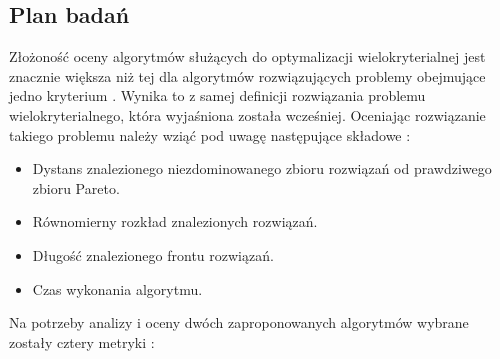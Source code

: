 \documentclass[twoside]{iisthesis}
\begin{document}
\subsection{Plan badań}
Złożoność oceny algorytmów służących do optymalizacji wielokryterialnej jest znacznie większa niż tej dla algorytmów rozwiązujących problemy obejmujące jedno kryterium \cite{comparison_deb}. Wynika to z samej definicji rozwiązania problemu wielokryterialnego, która wyjaśniona została wcześniej. Oceniając rozwiązanie takiego problemu należy wziąć pod uwagę następujące składowe \cite{comparison_2}:\\
\begin{itemize}
	\item Dystans znalezionego niezdominowanego zbioru rozwiązań od prawdziwego zbioru Pareto.
	\item Równomierny rozkład znalezionych rozwiązań.
	\item Długość znalezionego frontu rozwiązań.
	\item Czas wykonania algorytmu.\\
\end{itemize}
Na potrzeby analizy i oceny dwóch zaproponowanych algorytmów wybrane zostały cztery metryki \cite{comparison_deb}\cite{comparison_2}:\\
\end{document}
